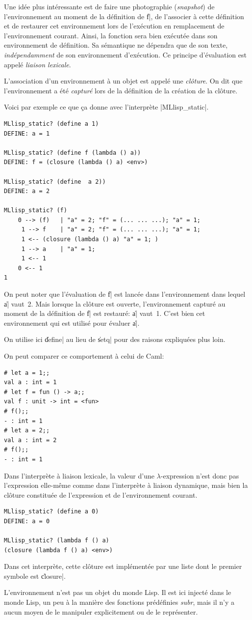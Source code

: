 \documentclass{../../LaTeX/tdsimple}
\begin{document}
Une idée plus intéressante est de faire une photographie
(\emph{snapshot}) de l'environnement au moment de la définition de
\|f|, de l'associer à cette définition et de restaurer cet
environnement lors de l'exécution en remplacement de l'environnement
courant. Ainsi, la fonction sera bien exécutée dans son environnement
de définition. Sa sémantique ne dépendra que de son texte,
\emph{indépendamment} de son environnement d'exécution. Ce principe
d'évaluation est appelé \emph{liaison lexicale}.

L'association d'un environnement à un objet est appelé une
\emph{clôture}. On dit que l'environnement a été \emph{capturé} lors
de la définition de la création de la clôture.

Voici par exemple ce que ça donne avec l'interprète
\raw|MLlisp_static|.
\begin{lstlisting}
MLlisp_static? (define a 1)
DEFINE: a = 1

MLlisp_static? (define f (lambda () a))
DEFINE: f = (closure (lambda () a) <env>)

MLlisp_static? (define  a 2))
DEFINE: a = 2

MLlisp_static? (f)
	0 --> (f)	| "a" = 2; "f" = (... ... ...); "a" = 1; 
	 1 --> f	| "a" = 2; "f" = (... ... ...); "a" = 1; 
	 1 <-- (closure (lambda () a) "a" = 1; )
	 1 --> a	| "a" = 1; 
	 1 <-- 1
	0 <-- 1
1
\end{lstlisting}
On peut noter que l'évaluation de \|f| est lancée dans l'environnement
dans lequel \|a| vaut~2. Mais lorsque la clôture est ouverte,
l'environnement capturé au moment de la définition de \|f| est
restauré: \|a| vaut~1. C'est bien cet environnement qui est utilisé
pour évaluer \|a|.
\begin{attention}
  On utilise ici \|define| au lieu de \|setq| pour des raisons
  expliquées plus loin.
\end{attention}

On peut comparer ce comportement à celui de Caml:
\begin{lstlisting}[language=caml]
# let a = 1;;
val a : int = 1
# let f = fun () -> a;;
val f : unit -> int = <fun>
# f();;
- : int = 1
# let a = 2;;
val a : int = 2
# f();;
- : int = 1
\end{lstlisting}

Dans l'interprète à liaison lexicale, la valeur d'une
$\lambda$-expression n'est donc pas l'expression elle-même comme dans
l'interprète à liaison dynamique, mais bien la clôture constituée de
l'expression et de l'environnement courant.
\begin{lstlisting}
MLlisp_static? (define a 0)
DEFINE: a = 0

MLlisp_static? (lambda f () a)
(closure (lambda f () a) <env>)
\end{lstlisting}
Dans cet interprète, cette clôture est implémentée par une liste dont
le premier symbole est \|closure|.
\begin{attention}
  L'environnement n'est pas un objet du monde Lisp. Il est ici injecté
  dans le monde Lisp, un peu à la manière des fonctions prédéfinies
  \emph{subr}, mais il n'y a aucun moyen de le manipuler explicitement
  ou de le représenter.
\end{attention}
\end{document}

